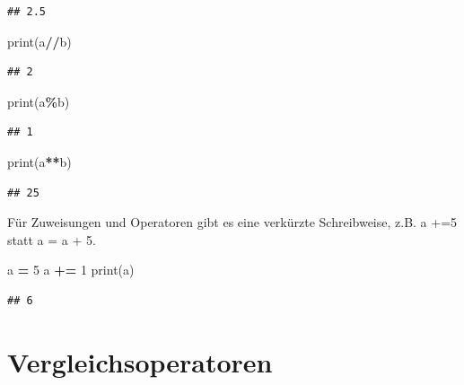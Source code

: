 \documentclass[
]{book}
\newenvironment{Shaded}{\begin{snugshade}}{\end{snugshade}}
\newcommand{\BuiltInTok}[1]{#1}
\newcommand{\DecValTok}[1]{\textcolor[rgb]{0.00,0.00,0.81}{#1}}
\newcommand{\NormalTok}[1]{#1}
\newcommand{\OperatorTok}[1]{\textcolor[rgb]{0.81,0.36,0.00}{\textbf{#1}}}
\begin{document}
\begin{verbatim}
## 2.5
\end{verbatim}

\begin{Shaded}
\begin{Highlighting}[]
\BuiltInTok{print}\NormalTok{(a}\OperatorTok{//}\NormalTok{b)}
\end{Highlighting}
\end{Shaded}

\begin{verbatim}
## 2
\end{verbatim}

\begin{Shaded}
\begin{Highlighting}[]
\BuiltInTok{print}\NormalTok{(a}\OperatorTok{\%}\NormalTok{b)}
\end{Highlighting}
\end{Shaded}

\begin{verbatim}
## 1
\end{verbatim}

\begin{Shaded}
\begin{Highlighting}[]
\BuiltInTok{print}\NormalTok{(a}\OperatorTok{**}\NormalTok{b)}
\end{Highlighting}
\end{Shaded}

\begin{verbatim}
## 25
\end{verbatim}

Für Zuweisungen und Operatoren gibt es eine verkürzte Schreibweise, z.B. a +=5 statt a = a + 5.

\begin{Shaded}
\begin{Highlighting}[]
\NormalTok{a }\OperatorTok{=} \DecValTok{5}
\NormalTok{a }\OperatorTok{+=} \DecValTok{1}
\BuiltInTok{print}\NormalTok{(a)}
\end{Highlighting}
\end{Shaded}

\begin{verbatim}
## 6
\end{verbatim}

\hypertarget{vergleichsoperatoren}{%
\section{Vergleichsoperatoren}\label{vergleichsoperatoren}}
\end{document}
